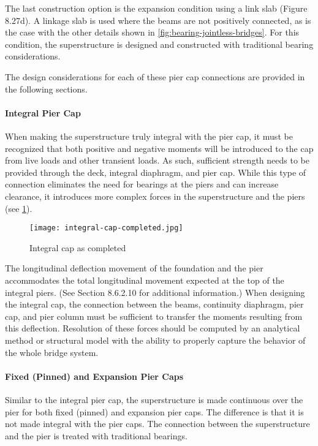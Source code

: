 The last construction option is the expansion condition using a link slab (Figure 8.27d). A linkage slab is used
where the beams are not positively connected, as is the case with the other details shown in \cref{fig:bearing-jointless-bridges}. For this
condition, the superstructure is designed and constructed with traditional bearing considerations.

The design considerations for each of these pier cap connections are provided in the following sections.

\paragraph{Integral Pier Cap}

When making the superstructure truly integral with the pier cap, it must be recognized that both positive and
negative moments will be introduced to the cap from live loads and other transient loads. As such, sufficient strength
needs to be provided through the deck, integral diaphragm, and pier cap. While this type of connection eliminates the
need for bearings at the piers and can increase clearance, it introduces more complex forces in the superstructure and
the piers (see \cref{fig:integral-cap-completed}).

\begin{figure}
  \texttt{[image: integral-cap-completed.jpg]}
  \caption{Integral cap as completed}
  \label{fig:integral-cap-completed}
\end{figure}

The longitudinal deflection movement of the foundation and the pier accommodates the total longitudinal movement expected at the top of the integral piers. (See Section 8.6.2.10 for additional information.) When designing the integral cap, the connection between the beams, continuity diaphragm, pier cap, and pier column must be sufficient to transfer the moments resulting from this deflection. Resolution of these forces should be computed by an analytical method or structural model with the ability to properly capture the behavior of the whole bridge system.

\paragraph{Fixed (Pinned) and Expansion Pier Caps}

Similar to the integral pier cap, the superstructure is made continuous over the pier for both fixed (pinned) and expansion pier caps. The difference is that it is not made integral with the pier caps. The connection between the superstructure and the pier is treated with traditional bearings.

